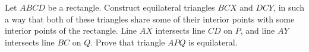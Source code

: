 Let $ABCD$ be a rectangle. Construct equilateral triangles $BCX$ and $DCY$,  in such a way that both of these triangles share some of their interior points with some interior points of the rectangle. Line $AX$ intersects line $CD$ on $P$,  and line $AY$ intersects line $BC$ on $Q$. Prove that triangle $APQ$ is equilateral.